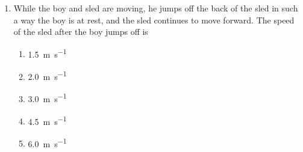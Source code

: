 \documentclass{../../oss-apphys}
\begin{document}
\begin{multicols}{2}
\begin{enumerate}[resume,leftmargin=18pt]
  \item While the boy and sled are moving, he jumps off the back of the sled in
    such a way the boy is at rest, and the sled continues to move forward.
    The speed of the sled after the boy jumps off is
    \label{boy2}
    \begin{enumerate}[noitemsep,topsep=0pt,leftmargin=18pt,label=(\Alph*)]
    \item\SI{1.5}{\metre\per\second}
    \item\SI{2.0}{\metre\per\second}
    \item\SI{3.0}{\metre\per\second}
    \item\SI{4.5}{\metre\per\second}
    \item\SI{6.0}{\metre\per\second}
    \end{enumerate}
  \end{enumerate}


\end{multicols}
\end{document}
